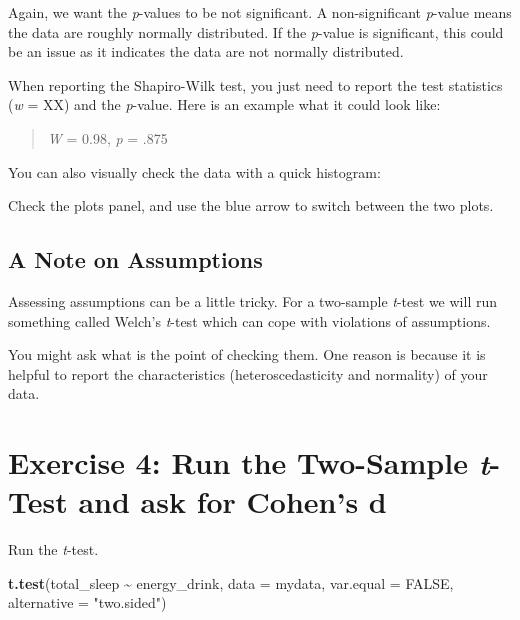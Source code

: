 \documentclass[
]{book}
\newenvironment{Shaded}{\begin{snugshade}}{\end{snugshade}}
\newcommand{\AttributeTok}[1]{\textcolor[rgb]{0.13,0.29,0.53}{#1}}
\newcommand{\ConstantTok}[1]{\textcolor[rgb]{0.56,0.35,0.01}{#1}}
\newcommand{\FunctionTok}[1]{\textcolor[rgb]{0.13,0.29,0.53}{\textbf{#1}}}
\newcommand{\NormalTok}[1]{#1}
\newcommand{\SpecialCharTok}[1]{\textcolor[rgb]{0.81,0.36,0.00}{\textbf{#1}}}
\newcommand{\StringTok}[1]{\textcolor[rgb]{0.31,0.60,0.02}{#1}}
\let\oldsection\section
\renewcommand{\section}{\needspace{5\baselineskip}\oldsection}
\let\oldsubsection\subsection
\renewcommand{\subsection}{\needspace{3\baselineskip}\oldsubsection}  %
\begin{document}
Again, we want the \emph{p}-values to be not significant. A non-significant \emph{p}-value means the data are roughly normally distributed. If the \emph{p}-value is significant, this could be an issue as it indicates the data are not normally distributed.

When reporting the Shapiro-Wilk test, you just need to report the test statistics (\emph{w} = XX) and the \emph{p}-value. Here is an example what it could look like:

\begin{quote}
\emph{W} = 0.98, \emph{p} = .875
\end{quote}

You can also visually check the data with a quick histogram:

\begin{Shaded}
\end{Shaded}

Check the plots panel, and use the blue arrow to switch between the two plots.

\subsection{A Note on Assumptions}\label{a-note-on-assumptions}

Assessing assumptions can be a little tricky. For a two-sample \emph{t}-test we will run something called Welch's \emph{t}-test which can cope with violations of assumptions.

You might ask what is the point of checking them. One reason is because it is helpful to report the characteristics (heteroscedasticity and normality) of your data.

\section{\texorpdfstring{Exercise 4: Run the Two-Sample \emph{t}-Test and ask for Cohen's d}{Exercise 4: Run the Two-Sample t-Test and ask for Cohen's d}}\label{exercise-4-run-the-two-sample-t-test-and-ask-for-cohens-d}

Run the \emph{t}-test.

\begin{Shaded}
\begin{Highlighting}[]
\FunctionTok{t.test}\NormalTok{(total\_sleep }\SpecialCharTok{\textasciitilde{}}\NormalTok{ energy\_drink, }\AttributeTok{data =}\NormalTok{ mydata, }\AttributeTok{var.equal =} \ConstantTok{FALSE}\NormalTok{, }\AttributeTok{alternative =} \StringTok{"two.sided"}\NormalTok{)}
\end{Highlighting}
\end{Shaded}
\end{document}
